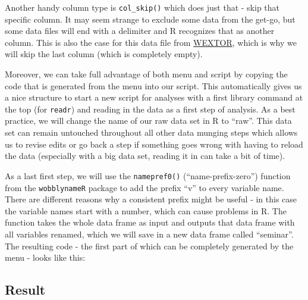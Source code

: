 \documentclass[
]{book}
\begin{document}
Another handy column type is \texttt{col\_skip()} which does just that - skip that specific column.
It may seem strange to exclude some data from the get-go, but some data files will end with a delimiter and R recognizes that as another column.
This is also the case for this data file from \href{https://www.wextor.eu}{WEXTOR}, which is why we will skip the last column (which is completely empty).

Moreover, we can take full advantage of both menu and script by copying the code that is generated from the menu into our script.
This automatically gives us a nice structure to start a new script for analyses with a first library command at the top (for \texttt{readr}) and reading in the data as a first step of analysis.
As a best practice, we will change the name of our raw data set in R to ``raw''.
This data set can remain untouched throughout all other data munging steps which allows us to revise edits or go back a step if something goes wrong with having to reload the data (especially with a big data set, reading it in can take a bit of time).

As a last first step, we will use the \texttt{namepref0()} (``name-prefix-zero'') function from the \texttt{wobblynameR} package to add the prefix ``v'' to every variable name.
There are different reasons why a consistent prefix might be useful - in this case the variable names start with a number, which can cause problems in R.
The function takes the whole data frame as input and outputs that data frame with all variables renamed, which we will save in a new data frame called ``seminar''.
The resulting code - the first part of which can be completely generated by the menu - looks like this:

\subsection*{Result}\label{result}
\end{document}

